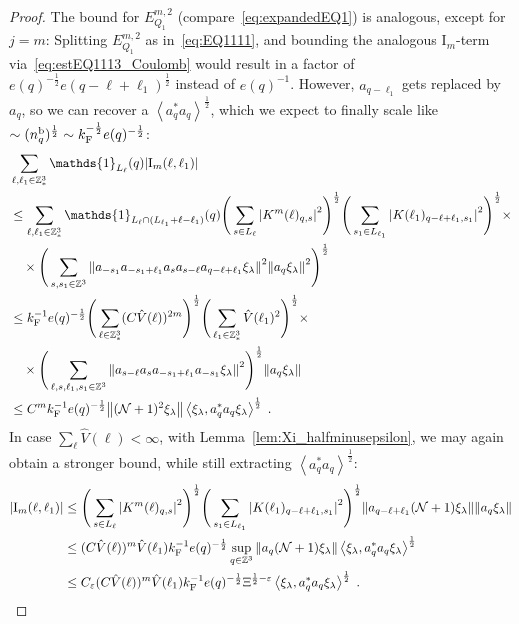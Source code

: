 \documentclass[12pt,a4paper]{article}
\numberwithin{equation}{section}
\newcommand{\1}{\mathbb{I}}
\renewcommand{\b}{\textnormal{b}}
\newcommand{\F}{\mathrm{F}}
\newcommand{\I}{\mathrm{I}}
\newcommand{\Z}{\mathbb{Z}}
\newcommand{\NN}{\mathcal{N}}
\newcommand{\half}{\frac{1}{2}}
\newcommand{\eva}[1]{\left\langle #1 \right\rangle}
\theoremstyle{plain}
\theoremstyle{definition}
\theoremstyle{remark}
\theoremstyle{plain}
\theoremstyle{definition}
\theoremstyle{remark}
\begin{document}
\begin{proof}
The bound for $ E^{m,2}_{Q_1} $ (compare~\eqref{eq:expandedEQ1}) is analogous, except for $ j = m $: Splitting $ E^{m,2}_{Q_1} $ as in~\eqref{eq:EQ1111}, and bounding the analogous $ \I_m $-term via~\eqref{eq:estEQ1113_Coulomb} would result in a factor of $ e(q)^{-\half} e(q-\ell+\ell_1)^{\half} $ instead of $ e(q)^{-1} $. However, $ a_{q-\ell_1} $ gets replaced by $ a_q $, so we can recover a $ \eva{a_q^* a_q}^{\half} $, which we expect to finally scale like $ \sim (n_q^{\b})^{\half} \sim k_{\F}^{-\half} e(q)^{-\half} $: 
\begin{align}
		&\sum_{\ell,\ell_1 \in \Z^3_*} \mathds{1}_{L_\ell}(q) |\I_m(\ell, \ell_1)| \nonumber\\
		&\leq \sum_{\ell,\ell_1 \in \Z^3_*} \mathds{1}_{L_\ell \cap (L_{\ell_1}+\ell-\ell_1) }(q)
		\Bigg(\sum\limits_{s \in L_{\ell}} \abs{K^m(\ell)_{q,s}}^2\Bigg)^\half
		\Bigg(\sum\limits_{s_1 \in L_{\ell_1}} \abs{K(\ell_1)_{q-\ell+\ell_1,s_1}}^2\Bigg)^\half \times \nonumber\\
		&\quad \times \Bigg( \sum_{s,s_1 \in \Z^3} \norm{ a_{-s_1} a_{-s_1+\ell_1} a_s a_{s-\ell} a_{q-\ell+\ell_1} \xi_\lambda}^2
		\norm{ a_q \xi_\lambda }^2 \Bigg)^{\half} \nonumber\\
		&\leq k_{\F}^{-1} e(q)^{-\frac 12}
		\Bigg(\sum_{\ell \in \Z^3_*} (C \hat{V}(\ell))^{2m} \Bigg)^\half
		\Bigg(\sum_{\ell_1 \in \Z^3_*} \hat{V}(\ell_1)^2 \Bigg)^\half \times \nonumber\\
		&\quad \times \Bigg( \sum_{\ell, s, \ell_1, s_1 \in \Z^3} \norm{ a_{s-\ell} a_s a_{-s_1+\ell_1} a_{-s_1} \xi_\lambda}^2\Bigg)^{\half}
		\norm{ a_q \xi_\lambda }  \nonumber\\
		&\leq C^m k_{\F}^{-1} e(q)^{-\frac 12}
			\norm{ (\NN+1)^2 \xi_\lambda }
			\eva{\xi_{\lambda},a_q^* a_q\xi_{\lambda}}^{\half} \;. \label{eq:estEQ1113_Coulomb_bis}
\end{align}
In case $ \sum_\ell \hat{V}(\ell) < \infty $, with Lemma~\ref{lem:Xi_halfminusepsilon}, we may again obtain a stronger bound, while still extracting $ \eva{a_q^* a_q}^{\half} $:
\begin{align}
		|\I_m(\ell, \ell_1)|
		&\leq \Bigg(\sum\limits_{s \in L_{\ell}} \abs{K^m(\ell)_{q,s}}^2\Bigg)^\half
		\Bigg(\sum\limits_{s_1 \in L_{\ell_1}} \abs{K(\ell_1)_{q-\ell+\ell_1,s_1}}^2\Bigg)^\half
		\norm{ a_{q-\ell+\ell_1} (\NN+1) \xi_\lambda}
		\norm{ a_q \xi_\lambda }\nonumber\\
		&\leq (C \hat{V}(\ell))^m \hat{V}(\ell_1) k_{\F}^{-1} e(q)^{-\half}
		\sup_{q \in \Z^3} \norm{ a_q (\NN+1) \xi_\lambda }
		\eva{\xi_{\lambda},a_q^* a_q\xi_{\lambda}}^{\half} \nonumber\\
		&\leq C_\varepsilon (C \hat{V}(\ell))^m
		\hat{V}(\ell_1)
		k_{\F}^{-1} e(q)^{-\half} \Xi^{\half-\varepsilon} \eva{\xi_{\lambda},a_q^* a_q\xi_{\lambda}}^{\half} \;. \label{eq:estEQ1113_bis}
\end{align}
\end{proof}
\end{document}
